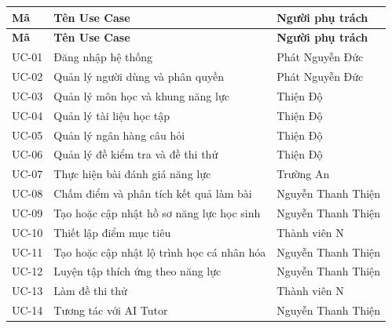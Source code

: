 \documentclass[12pt,a4paper]{article}
\begin{document}
	\begin{longtable}{
			|>{\centering\arraybackslash}p{1.6cm}
			|p{8.3cm}
			|p{4.3cm}|
		}
		\hline
		\textbf{Mã} &
		\textbf{Tên Use Case} &
		\textbf{Người phụ trách} \\
		\hline
		\endfirsthead
		
		\hline
		\textbf{Mã} &
		\textbf{Tên Use Case} &
		\textbf{Người phụ trách} \\
		\hline
		\endhead
		
		UC-01 & Đăng nhập hệ thống & Phát Nguyễn Đức \\
		\hline
		
		UC-02 & Quản lý người dùng và phân quyền & Phát Nguyễn Đức \\
		\hline
		
		UC-03 & Quản lý môn học và khung năng lực & Thiện Độ \\
		\hline
		
		UC-04 & Quản lý tài liệu học tập & Thiện Độ \\
		\hline
		
		UC-05 & Quản lý ngân hàng câu hỏi & Thiện Độ \\
		\hline
		
		UC-06 & Quản lý đề kiểm tra và đề thi thử & Thiện Độ \\
		\hline
		
		UC-07 & Thực hiện bài đánh giá năng lực & Trường An \\
		\hline
		
		UC-08 & Chấm điểm và phân tích kết quả làm bài & Nguyễn Thanh Thiện \\
		\hline
		
		UC-09 & Tạo hoặc cập nhật hồ sơ năng lực học sinh & Nguyễn Thanh Thiện \\
		\hline
		
		UC-10 & Thiết lập điểm mục tiêu & Thành viên N \\
		\hline
		
		UC-11 & Tạo hoặc cập nhật lộ trình học cá nhân hóa & Nguyễn Thanh Thiện \\
		\hline
		
		UC-12 & Luyện tập thích ứng theo năng lực & Nguyễn Thanh Thiện \\
		\hline
		
		UC-13 & Làm đề thi thử & Thành viên N \\
		\hline
		
		UC-14 & Tương tác với AI Tutor & Nguyễn Thanh Thiện \\
		\hline
		

\end{longtable}
\end{document}

